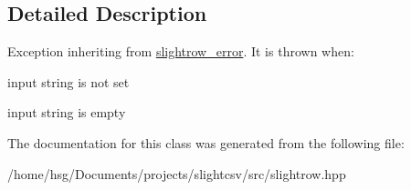 \subsection{Detailed Description}
Exception inheriting from \hyperlink{classutils_1_1slightrow__error}{slightrow\+\_\+error}. It is thrown when\+:
\begin{DoxyItemize}
\item input string is not set
\item input string is empty 
\end{DoxyItemize}

The documentation for this class was generated from the following file\+:\begin{DoxyCompactItemize}
\item 
/home/hsg/\+Documents/projects/slightcsv/src/slightrow.\+hpp\end{DoxyCompactItemize}

